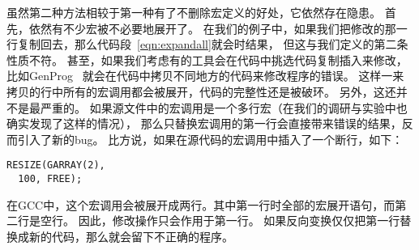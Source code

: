 虽然第二种方法相较于第一种有了不删除宏定义的好处，它依然存在隐患。
首先，依然有不少宏被不必要地展开了。
在我们的例子中，如果我们把修改的那一行复制回去，那么代码段~\ref{eqn:expandall}就会时结果，
但这与我们定义的第二条性质不符。
甚至，如果我们考虑有的工具会在代码中挑选代码复制插入来修改，比如GenProg~\parencite{le2012genprog}
就会在代码中拷贝不同地方的代码来修改程序的错误。
这样一来拷贝的行中所有的宏调用都会被展开，代码的完整性还是被破环。
另外，这还并不是最严重的。
如果源文件中的宏调用是一个多行宏（在我们的调研与实验中也确实发现了这样的情况），
那么只替换宏调用的第一行会直接带来错误的结果，反而引入了新的bug。
比方说，如果在源代码的宏调用中插入了一个断行，如下：
\begin{lstlisting}
RESIZE(GARRAY(2),
  100, FREE);
\end{lstlisting}
在GCC中，这个宏调用会被展开成两行。其中第一行时全部的宏展开语句，而第二行是空行。
因此，修改操作只会作用于第一行。
如果反向变换仅仅把第一行替换成新的代码，那么就会留下不正确的程序。




